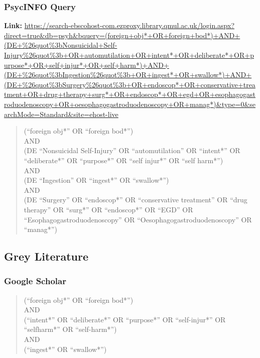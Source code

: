 \subsubsection{PsycINFO Query}
\textbf{Link:} \url{https://search-ebscohost-com.ezproxy.library.qmul.ac.uk/login.aspx?direct=true&db=psyh&bquery=(foreign+obj*+OR+foreign+bod*)+AND+(DE+%26quot%3bNonsuicidal+Self-Injury%26quot%3b+OR+automutilation+OR+intent*+OR+deliberate*+OR+purpose*+OR+self+injur*+OR+self+harm*)+AND+(DE+%26quot%3bIngestion%26quot%3b+OR+ingest*+OR+swallow*)+AND+(DE+%26quot%3bSurgery%26quot%3b+OR+endoscop*+OR+conservative+treatment+OR+drug+therapy+surg*+OR+endoscop*+OR+egd+OR+esophagogastroduodenoscopy+OR+oesophagogastroduodenoscopy+OR+manag*)&type=0&searchMode=Standard&site=ehost-live}
\begin{quote}
(\enquote{foreign obj*} OR \enquote{foreign bod*})\\
AND\\
(DE \enquote{Nonsuicidal Self-Injury} OR \enquote{automutilation} OR \enquote{intent*} OR \enquote{deliberate*} OR \enquote{purpose*} OR \enquote{self injur*} OR \enquote{self harm*})\\
AND\\
(DE \enquote{Ingestion} OR \enquote{ingest*} OR \enquote{swallow*})\\
AND\\
(DE \enquote{Surgery} OR \enquote{endoscop*} OR \enquote{conservative treatment} OR \enquote{drug therapy} OR \enquote{surg*} OR \enquote{endoscop*} OR \enquote{EGD} OR \enquote{Esophagogastroduodenoscopy} OR \enquote{Oesophagogastroduodenoscopy} OR \enquote{manag*})
\end{quote}

\subsection{Grey Literature}

\subsubsection*{Google Scholar}
\begin{quote}
(\enquote{foreign obj*} OR \enquote{foreign bod*})\\
AND\\
(\enquote{intent*} OR \enquote{deliberate*} OR \enquote{purpose*} OR \enquote{self-injur*} OR \enquote{selfharm*} OR \enquote{self-harm*})\\
AND\\
(\enquote{ingest*} OR \enquote{swallow*})
\end{quote}


